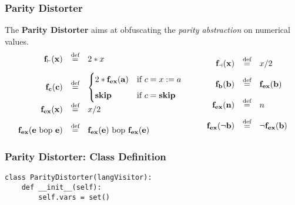 \documentclass{beamer}
\begin{document}
\begin{frame}
    \frametitle{Parity Distorter}
    \scriptsize
    The \textbf{Parity Distorter} aims at obfuscating the \textit{parity abstraction} on numerical values.
    \[
        \begin{array}{rcl}
            \mathbf{f_{\vdash}(x)}            & \overset{\text{def}}{=} & 2 * x                                              \\[1em]
            \mathbf{f_c(c)}                   & \overset{\text{def}}{=} &
            \begin{cases}
                2 * \mathbf{f_{ex}(a)} & \text{if } c = x := a               \\[0.5em]
                \text{\textbf{skip}}   & \text{if } c = \text{\textbf{skip}}
            \end{cases}                     \\[1em]

            \mathbf{f_{ex}(x)}                & \overset{\text{def}}{=} & x / 2                                              \\[1em]

            \mathbf{f_{ex}(e \text{ bop } e)} & \overset{\text{def}}{=} & \mathbf{f_{ex}(e)} \text{ bop } \mathbf{f_{ex}(e)}
        \end{array}
        \quad\quad
        \begin{array}{rcl}
            \mathbf{f_{\dashv}(x)}  & \overset{\text{def}}{=} & x / 2                   \\[1em]

            \mathbf{f_b(b)}         & \overset{\text{def}}{=} & \mathbf{f_{ex}(b)}      \\[1em]

            \mathbf{f_{ex}(n)}      & \overset{\text{def}}{=} & n                       \\[1em]

            \mathbf{f_{ex}(\neg b)} & \overset{\text{def}}{=} & \neg \mathbf{f_{ex}(b)}
        \end{array}
    \]
\end{frame}

\begin{frame}[fragile]
    \frametitle{Parity Distorter: Class Definition}
    \scriptsize
    \begin{verbatim}
class ParityDistorter(langVisitor):
    def __init__(self):
        self.vars = set()
    \end{verbatim}
\end{frame}
\end{document}

